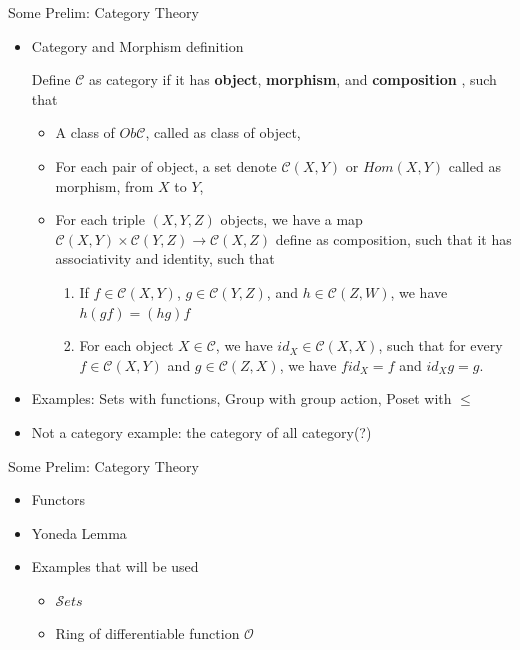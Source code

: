 \documentclass[10pt,aspectratio=1610]{beamer}
\theoremstyle{definition}
\begin{document}
    \begin{frame}{Some Prelim: Category Theory}
        \begin{itemize}
            \item Category and Morphism definition
            \begin{definition}[Category]
                Define $\mathcal{C}$ as category if it has \textbf{object}, \textbf{morphism},  and \textbf{composition} , such that
                \begin{itemize}
                    \item A class of $Ob\mathcal{C}$, called as class of object,
                    \item For each pair of object, a set denote $\mathcal{C}(X,Y)$ or $Hom(X, Y)$ called as morphism, from $X$ to $Y$,
                    \item For each triple $(X,Y,Z)$ objects, we have a map $\mathcal{C}(X,Y) \times \mathcal{C}(Y,Z) \to \mathcal{C}(X,Z)$ define as composition, such that it has associativity and identity, such that 
                    \begin{enumerate}
                        \item If $f \in \mathcal{C}(X,Y)$, $g \in \mathcal{C}(Y,Z)$, and $h \in \mathcal{C}(Z,W)$, we have $h(gf) = (hg)f$
                        \item For each object $X \in \mathcal{C}$, we have $id_X \in \mathcal{C}(X,X)$, such that for every $f \in \mathcal{C}(X,Y)$ and $g \in \mathcal{C}(Z,X)$, we have $f id_X = f$ and $id_X g= g$.
                    \end{enumerate}
                    
                \end{itemize}
                
            \end{definition}

            \item Examples: Sets with functions, Group with group action, Poset with $\leq$
            \item Not a category example: the category of all category(?)
        \end{itemize}
    \end{frame}

    \begin{frame}{Some Prelim: Category Theory}
        \begin{itemize}
            \item Functors
            \item Yoneda Lemma 
            \item Examples that will be used
            \begin{itemize}
                \item $\mathcal{S}ets$
                \item Ring of differentiable function $\mathcal{O}$
            \end{itemize}
            
        \end{itemize}
    \end{frame}
\end{document}
